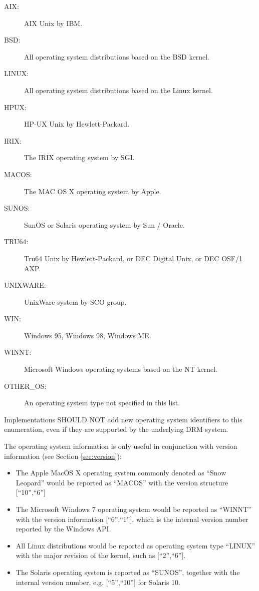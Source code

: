 \documentclass{article}
\begin{document}
\begin{description}
\item[AIX:] AIX Unix by IBM.
\item[BSD:] All operating system distributions based on the BSD kernel.
\item[LINUX:] All operating system distributions based on the Linux kernel.
\item[HPUX:] HP-UX Unix by Hewlett-Packard.
\item[IRIX:] The IRIX operating system by SGI.
\item[MACOS:] The MAC OS X operating system by Apple.
\item[SUNOS:] SunOS or Solaris operating system by Sun / Oracle.
\item[TRU64:] Tru64 Unix by Hewlett-Packard, or DEC Digital Unix, or DEC OSF/1 AXP.
\item[UNIXWARE:] UnixWare system by SCO group.
\item[WIN:] Windows 95, Windows 98, Windows ME.
\item[WINNT:] Microsoft Windows operating systems based on the NT kernel.
\item[OTHER\_OS:] An operating system type not specified in this list.
\end{description}

Implementations SHOULD NOT add new operating system identifiers to this enumeration, even if they are supported by the underlying DRM system.

The operating system information is only useful in conjunction with version information (see Section \ref{sec:version}):

\begin{itemize}
	\item The Apple MacOS X operating system commonly denoted as \enquote{Snow Leopard} would be reported as \enquote{MACOS} with the version structure [\enquote{10},\enquote{6}]
    \item The Microsoft Windows 7 operating system would be reported as \enquote{WINNT} with the version information [\enquote{6},\enquote{1}], which is the internal version number reported by the Windows API.
    \item All Linux distributions would be reported as operating system type \enquote{LINUX} with the major revision of the kernel, such as [\enquote{2},\enquote{6}].
    \item The Solaris operating system is reported as \enquote{SUNOS}, together with the internal version number, e.g. [\enquote{5},\enquote{10}] for Solaris 10.
\end{itemize}
\end{document}
